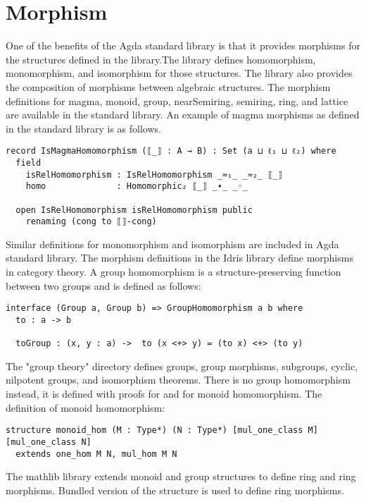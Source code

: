 \section{Morphism}
One of the benefits of the Agda standard library is that it provides morphisms
for the structures defined in the library.The library defines homomorphism,
monomorphism, and isomorphism for those structures. The library also provides
the composition of morphisms between algebraic structures. The morphism
definitions for magma, monoid, group, nearSemiring, semiring, ring, and lattice are
available in the standard library. An example of magma morphisms as defined in
the standard library is as follows.

\begin{verbatim}
record IsMagmaHomomorphism (⟦_⟧ : A → B) : Set (a ⊔ ℓ₁ ⊔ ℓ₂) where
  field
    isRelHomomorphism : IsRelHomomorphism _≈₁_ _≈₂_ ⟦_⟧
    homo              : Homomorphic₂ ⟦_⟧ _∙_ _◦_

  open IsRelHomomorphism isRelHomomorphism public
    renaming (cong to ⟦⟧-cong)
\end{verbatim}

Similar definitions for monomorphism and isomorphism are included in Agda
standard library. The morphism definitions in the Idris library define morphisms
in category theory. A group homomorphism is a structure-preserving function
between two groups and is defined as follows:


\begin{verbatim}
interface (Group a, Group b) => GroupHomomorphism a b where
  to : a -> b

  toGroup : (x, y : a) ->  to (x <+> y) = (to x) <+> (to y)

\end{verbatim}

The "group theory" directory defines groups, group morphisms, subgroups, cyclic,
nilpotent groups, and isomorphism theorems. There is no group homomorphism
instead, it is defined with proofs for  and  for
monoid homomorphism. The definition of monoid homomorphism:

\begin{verbatim}
structure monoid_hom (M : Type*) (N : Type*) [mul_one_class M] [mul_one_class N]
  extends one_hom M N, mul_hom M N
\end{verbatim}

The mathlib library extends monoid and group structures to define ring and ring
morphisms. Bundled version of the structure is used to define ring morphisms.

